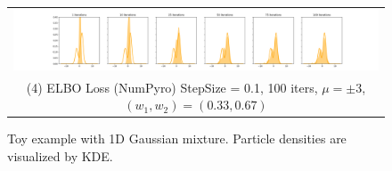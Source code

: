 \begin{figure}[!htbp]
    \begin{tabular}{@{}c@{}}
        \includegraphics[width=\toyfigwidth]{figs/toy-figure1-numpyro.png} \\
        \small (4) ELBO Loss (NumPyro) StepSize = 0.1, 100 iters, $\mu = \pm 3$, $(w_1, w_2) = (0.33, 0.67)$
    \end{tabular}
     
    \caption{Toy example with 1D Gaussian mixture. Particle densities are visualized by KDE.}
    \label{fig:toy1dgaussian}
\end{figure}
